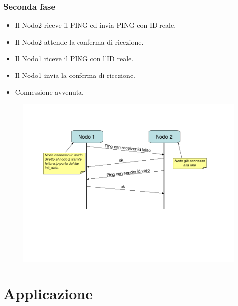 \documentclass[a4paper,italian,12pt]{beamer}
\begin{document}
			\begin{frame}
				\frametitle{Seconda fase}
				\begin{itemize}
					\item Il Nodo2 riceve il PING ed invia PING con ID reale.
					\item Il Nodo2 attende la conferma di ricezione.
					\item Il Nodo1 riceve il PING con l'ID reale.
					\item Il Nodo1 invia la conferma di ricezione.
					\item Connessione avvenuta.
				\end{itemize}
				\begin{figure}[H]
					\begin{center}
						\includegraphics[scale=0.3]{etc/Bootstrap.png}
					\end{center}
				\end{figure}
			\end{frame}

	\section{Applicazione}
\end{document}
